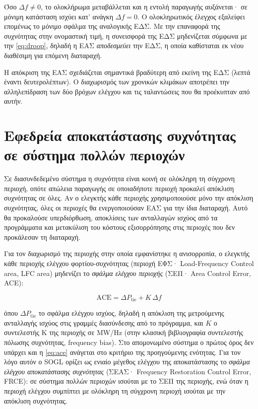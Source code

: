 Όσο $\Delta f \neq 0$, το ολοκλήρωμα μεταβάλλεται και η εντολή παραγωγής αυξάνεται· σε μόνιμη
κατάσταση ισχύει κατ' ανάγκη $\Delta f = 0$. Ο ολοκληρωτικός έλεγχος εξαλείφει επομένως το
μόνιμο σφάλμα της αναλογικής ΕΔΣ. Με την επαναφορά της συχνότητας στην ονομαστική τιμή, η
συνεισφορά της ΕΔΣ μηδενίζεται σύμφωνα με την \eqref{eq:droop}, δηλαδή η ΕΑΣ
\emph{αποδεσμεύει} την ΕΔΣ, η οποία καθίσταται εκ νέου διαθέσιμη για επόμενη διαταραχή.

Η απόκριση της ΕΑΣ σχεδιάζεται σημαντικά βραδύτερη από εκείνη της ΕΔΣ (λεπτά έναντι
δευτερολέπτων). Ο διαχωρισμός των χρονικών κλιμάκων αποτρέπει την αλληλεπίδραση των δύο
βρόχων ελέγχου και τις ταλαντώσεις που θα προέκυπταν από αυτήν.

\section{Εφεδρεία αποκατάστασης συχνότητας σε σύστημα πολλών περιοχών}
\label{sec:frr-multi}

Σε διασυνδεδεμένο σύστημα η συχνότητα είναι κοινή σε ολόκληρη τη σύγχρονη περιοχή,
οπότε απώλεια παραγωγής σε οποιαδήποτε περιοχή προκαλεί απόκλιση συχνότητας σε όλες. Αν ο
ελεγκτής κάθε περιοχής χρησιμοποιούσε μόνο την απόκλιση συχνότητας, όλες οι περιοχές θα
ενεργοποιούσαν ΕΑΣ για την ίδια διαταραχή. Αυτό θα προκαλούσε υπερδιόρθωση, αποκλίσεις των
ανταλλαγών ισχύος από τα προγράμματα και μετακύλιση του κόστους εξισορρόπησης στις περιοχές
που δεν προκάλεσαν τη διαταραχή.

Για τον διαχωρισμό της περιοχής στην οποία εμφανίστηκε η ανισορροπία, ο ελεγκτής κάθε
περιοχής ελέγχου φορτίου-συχνότητας (περιοχή ΕΦΣ· Load-Frequency Control area, LFC area) μηδενίζει το \emph{σφάλμα ελέγχου
περιοχής} (ΣΕΠ· Area Control Error, ACE):

\begin{equation}
\mathrm{ACE} = \Delta P_{\mathrm{tie}} + K \, \Delta f
\label{eq:ace}
\end{equation}

όπου $\Delta P_{\mathrm{tie}}$ το σφάλμα ελέγχου ισχύος, δηλαδή η απόκλιση της μετρούμενης
ανταλλαγής ισχύος στις γραμμές διασύνδεσης από το πρόγραμμα, και $K$ ο συντελεστής K της
περιοχής σε MW/Hz (στην κλασική βιβλιογραφία συντελεστής πόλωσης συχνότητας, frequency
bias). Στο απομονωμένο σύστημα ο πρώτος όρος δεν υπάρχει και η \eqref{eq:ace} ανάγεται στο
κριτήριο της προηγούμενης ενότητας. Για τον λόγο αυτόν ο SOGL ορίζει ως ενιαίο μέγεθος
ελέγχου της αποκατάστασης το \emph{σφάλμα ελέγχου αποκατάστασης συχνότητας} (ΣΕΑΣ·
Frequency Restoration Control Error, FRCE): σε σύστημα πολλών περιοχών ισούται με το ΣΕΠ
της περιοχής, ενώ όταν η περιοχή ελέγχου συμπίπτει με ολόκληρη τη σύγχρονη περιοχή
ισούται με την απόκλιση συχνότητας.

